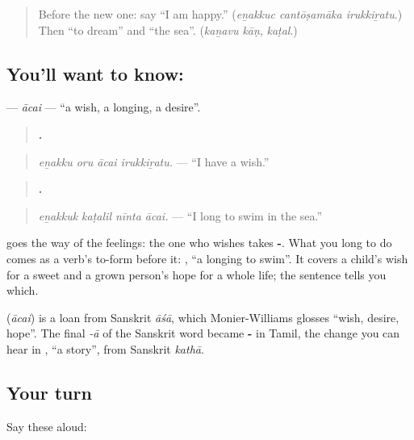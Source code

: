 \begin{quote}
Before the new one: say \textquotedblleft{}I am happy.\textquotedblright{} (\emph{eṉakkuc cantōṣamāka irukkiṟatu}.) Then \textquotedblleft{}to dream\textquotedblright{} and \textquotedblleft{}the sea\textquotedblright{}. (\emph{kaṉavu kāṇ}, \emph{kaṭal}.)
\end{quote}

\subsection*{You'll want to know: }
\textbf{} — \emph{ācai} — \textquotedblleft{}a wish, a longing, a desire\textquotedblright{}.

\begin{quote}
\textbf{   .}
\end{quote}

\begin{quote}
\emph{eṉakku oru ācai irukkiṟatu.} — \textquotedblleft{}I have a wish.\textquotedblright{}
\end{quote}

\begin{quote}
\textbf{   .}
\end{quote}

\begin{quote}
\emph{eṉakkuk kaṭalil nīnta ācai.} — \textquotedblleft{}I long to swim in the sea.\textquotedblright{}
\end{quote}

\textbf{} goes the way of the feelings: the one who wishes takes \textbf{-}. What you long to do comes as a verb's to-form before it: \textbf{ }, \textquotedblleft{}a longing to swim\textquotedblright{}. It covers a child's wish for a sweet and a grown person's hope for a whole life; the sentence tells you which.

\begin{cousinweb}
\textbf{} (\emph{ācai}) is a loan from Sanskrit \emph{āśā}, which Monier-Williams glosses \textquotedblleft{}wish, desire, hope\textquotedblright{}. The final \emph{-ā} of the Sanskrit word became \textbf{-} in Tamil, the change you can hear in \textbf{}, \textquotedblleft{}a story\textquotedblright{}, from Sanskrit \emph{kathā}.
\end{cousinweb}

\subsection*{Your turn}
Say these aloud:

